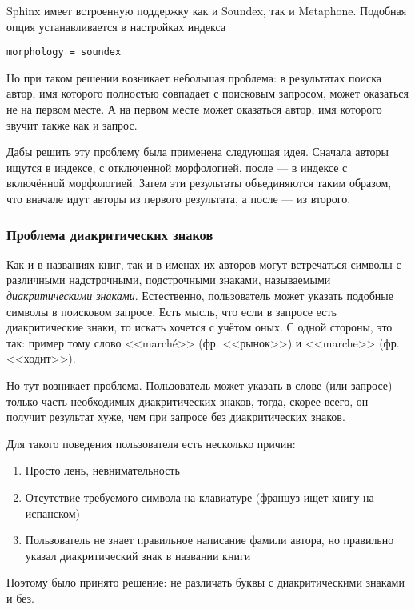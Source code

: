 Sphinx имеет встроенную поддержку как и Soundex, так и Metaphone. Подобная опция устанавливается в настройках индекса
\begin{verbatim}
morphology = soundex
\end{verbatim}

Но при таком решении возникает небольшая проблема: в результатах поиска автор, имя которого полностью совпадает с поисковым запросом, может оказаться не на первом месте. А на первом месте может оказаться автор, имя которого звучит также как и запрос.

Дабы решить эту проблему была применена следующая идея. 
Сначала авторы ищутся в индексе, с отключенной морфологией, после --- в индексе с включённой морфологией.
Затем эти результаты объединяются таким образом, что вначале идут авторы из первого результата, а после --- из второго.

\subsubsection{Проблема диакритических знаков}

Как и в названиях книг, так и в именах их авторов могут встречаться символы с различными надстрочными, подстрочными знаками, называемыми {\em диакритическими знаками}. Естественно, пользователь может указать подобные символы в поисковом запросе.
Есть мысль, что если в запросе есть диакритические знаки, то искать хочется с учётом оных. С одной стороны, это так: пример тому слово <<marché>> (фр. <<рынок>>) и <<marche>> (фр. <<ходит>>). 

Но тут возникает проблема. Пользователь может указать в слове (или запросе) только часть необходимых диакритических знаков, тогда, скорее всего, он получит результат хуже, чем при запросе без диакритических знаков. 

Для такого поведения пользователя есть несколько причин:
\begin{enumerate}
    \item Просто лень, невнимательность 
    \item Отсутствие требуемого символа на клавиатуре (француз ищет книгу на испанском) 
    \item Пользователь не знает правильное написание фамили автора, но правильно указал диакритический знак в названии книги 
\end{enumerate}

Поэтому было принято решение: не различать буквы с диакритическими знаками и без.

